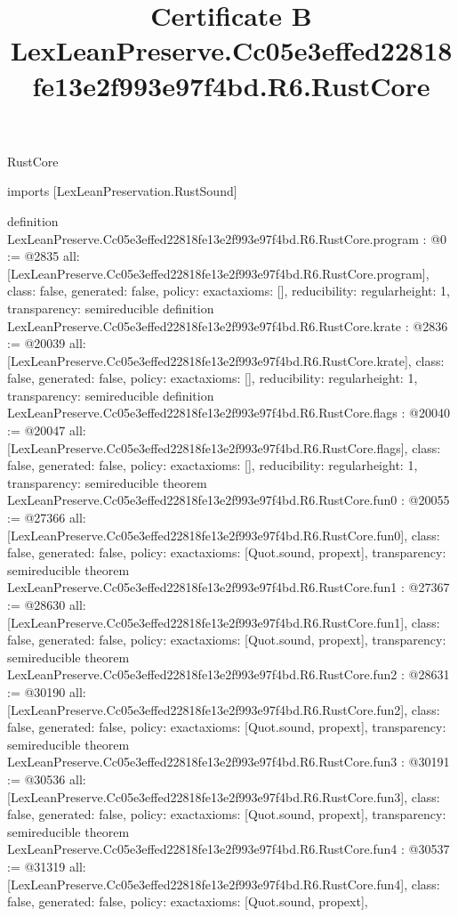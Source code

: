 \begin{lexlean}{RustCore}
\title{Certificate B LexLeanPreserve.Cc05e3effed22818fe13e2f993e97f4bd.R6.RustCore}
\begin{coremodule}
imports [LexLeanPreservation.RustSound]

definition LexLeanPreserve.Cc05e3effed22818fe13e2f993e97f4bd.R6.RustCore.program : @0 := @2835 {
  all: [LexLeanPreserve.Cc05e3effed22818fe13e2f993e97f4bd.R6.RustCore.program],
  class: false,
  generated: false,
  policy: exact{axioms: []},
  reducibility: regular{height: 1},
  transparency: semireducible
}
definition LexLeanPreserve.Cc05e3effed22818fe13e2f993e97f4bd.R6.RustCore.krate : @2836 := @20039 {
  all: [LexLeanPreserve.Cc05e3effed22818fe13e2f993e97f4bd.R6.RustCore.krate],
  class: false,
  generated: false,
  policy: exact{axioms: []},
  reducibility: regular{height: 1},
  transparency: semireducible
}
definition LexLeanPreserve.Cc05e3effed22818fe13e2f993e97f4bd.R6.RustCore.flags : @20040 := @20047 {
  all: [LexLeanPreserve.Cc05e3effed22818fe13e2f993e97f4bd.R6.RustCore.flags],
  class: false,
  generated: false,
  policy: exact{axioms: []},
  reducibility: regular{height: 1},
  transparency: semireducible
}
theorem LexLeanPreserve.Cc05e3effed22818fe13e2f993e97f4bd.R6.RustCore.fun0 : @20055 := @27366 {
  all: [LexLeanPreserve.Cc05e3effed22818fe13e2f993e97f4bd.R6.RustCore.fun0],
  class: false,
  generated: false,
  policy: exact{axioms: [Quot.sound, propext]},
  transparency: semireducible
}
theorem LexLeanPreserve.Cc05e3effed22818fe13e2f993e97f4bd.R6.RustCore.fun1 : @27367 := @28630 {
  all: [LexLeanPreserve.Cc05e3effed22818fe13e2f993e97f4bd.R6.RustCore.fun1],
  class: false,
  generated: false,
  policy: exact{axioms: [Quot.sound, propext]},
  transparency: semireducible
}
theorem LexLeanPreserve.Cc05e3effed22818fe13e2f993e97f4bd.R6.RustCore.fun2 : @28631 := @30190 {
  all: [LexLeanPreserve.Cc05e3effed22818fe13e2f993e97f4bd.R6.RustCore.fun2],
  class: false,
  generated: false,
  policy: exact{axioms: [Quot.sound, propext]},
  transparency: semireducible
}
theorem LexLeanPreserve.Cc05e3effed22818fe13e2f993e97f4bd.R6.RustCore.fun3 : @30191 := @30536 {
  all: [LexLeanPreserve.Cc05e3effed22818fe13e2f993e97f4bd.R6.RustCore.fun3],
  class: false,
  generated: false,
  policy: exact{axioms: [Quot.sound, propext]},
  transparency: semireducible
}
theorem LexLeanPreserve.Cc05e3effed22818fe13e2f993e97f4bd.R6.RustCore.fun4 : @30537 := @31319 {
  all: [LexLeanPreserve.Cc05e3effed22818fe13e2f993e97f4bd.R6.RustCore.fun4],
  class: false,
  generated: false,
  policy: exact{axioms: [Quot.sound, propext]},
}
\end{coremodule}
\end{lexlean}
